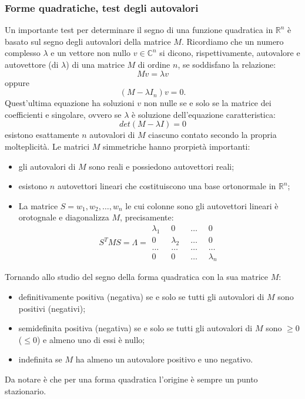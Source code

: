 \subsubsection*{Forme quadratiche, test degli autovalori}
Un importante test per determinare il segno di una funzione quadratica in $\mathbb{R}^n$ è basato sul segno degli autovalori della matrice $M$.\newline
Ricordiamo che un numero complesso $\lambda$ e un vettore non nullo $v \in \mathbb{C}^n$ si dicono, rispettivamente, autovalore e autovettore (di $\lambda$) di una matrice $M$ di ordine $n$, se soddisfano la relazione:
\[
    Mv = \lambda v
\]
oppure
\[
    (M-\lambda I_n)v = 0.
\]
Quest'ultima equazione ha soluzioni $v$ non nulle se e solo se la matrice dei coefficienti e singolare, ovvero se $\lambda$ è soluzione dell'equazione caratteristica:
\[
    det(M-\lambda I) = 0
\]
esistono esattamente $n$ autovalori di $M$ ciascuno contato secondo la propria molteplicità.\newline
Le matrici $M$ simmetriche hanno prorpietà importanti:
\begin{itemize}
    \item gli autovalori di $M$ sono reali e possiedono autovettori reali;
    \item esistono $n$ autovettori lineari che costituiscono una base ortonormale in $\mathbb{R}^n$;
    \item La matrice $S = {w_1, w_2, \dots, w_n}$ le cui colonne sono gli autovettori lineari è orotognale e diagonalizza $M$, precisamente:
    \[
        S^TMS = \Lambda = \begin{matrix}
            \lambda_1 \;\; &0 \;\; &\dots \;\; &0\\
            0 \;\; &\lambda_2 \;\; &\dots \;\; &0\\
            \dots \;\; &\dots \;\; &\dots \;\; &\dots\\
            0 \;\; &0 \;\; &\dots \;\; &\lambda_n
        \end{matrix}
    \]
\end{itemize}
Tornando allo studio del segno della forma quadratica con la sua matrice $M$:
\begin{itemize}
    \item definitivamente positiva (negativa) se e solo se tutti gli autovalori di $M$ sono positivi (negativi);
    \item semidefinita positiva (negativa) se e solo se tutti gli autovalori di $M$ sono $\geq 0$ ($\leq 0$) e almeno uno di essi è nullo;
    \item indefinita se $M$ ha almeno un autovalore positivo e uno negativo.
\end{itemize}
Da notare è che per una forma quadratica l'origine è sempre un punto stazionario.
